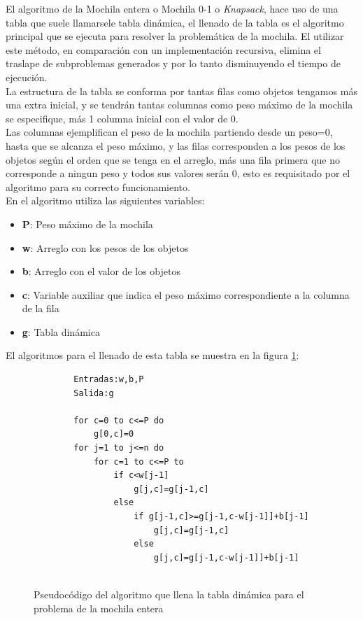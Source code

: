 
El algoritmo de la Mochila entera o Mochila 0-1 o \textit{Knapsack}, hace uso de una tabla que suele llamarsele tabla dinámica, el llenado de la tabla es el algoritmo principal que se ejecuta para resolver la problemática de la mochila. El utilizar este método, en comparación con un implementación recursiva, elimina el traslape de subproblemas generados y por lo tanto disminuyendo el tiempo de ejecución.\\

La estructura de la tabla se conforma por tantas filas como objetos tengamos más una extra inicial, y se tendrán tantas columnas como peso máximo de la mochila se especifique, más 1 columna inicial con el valor de 0.\\

Las columnas ejemplifican el peso de la mochila partiendo desde un peso=0, hasta que se alcanza el peso máximo, y las filas corresponden a los pesos de los objetos según el orden que se tenga en el arreglo, más una fila primera que no corresponde a ningun peso y todos sus valores serán 0, esto es requisitado por el algoritmo para su correcto funcionamiento.\\

En el algoritmo utiliza las siguientes variables:\\
\begin{itemize}
    \item \textbf{P}: Peso máximo de la mochila
    \item \textbf{w}: Arreglo con los pesos de los objetos
    \item \textbf{b}: Arreglo con el valor de los objetos
    \item \textbf{c}: Variable auxiliar que indica el peso máximo correspondiente a la columna de la fila
    \item \textbf{g}: Tabla dinámica
\end{itemize}

El algoritmos para el llenado de esta tabla se muestra en la figura \ref{PseudocodigoKnapsack}:
\begin{figure}[h!]
    \centering
    \begin{verbatim}
        Entradas:w,b,P
        Salida:g
        
        for c=0 to c<=P do 
            g[0,c]=0
        for j=1 to j<=n do
            for c=1 to c<=P to
                if c<w[j-1]
                    g[j,c]=g[j-1,c]
                else
                    if g[j-1,c]>=g[j-1,c-w[j-1]]+b[j-1]
                        g[j,c]=g[j-1,c]
                    else
                        g[j,c]=g[j-1,c-w[j-1]]+b[j-1]
            
    \end{verbatim}
    \caption{Pseudocódigo del algoritmo que llena la tabla dinámica para el problema de la mochila entera}
    \label{PseudocodigoKnapsack}
\end{figure}


